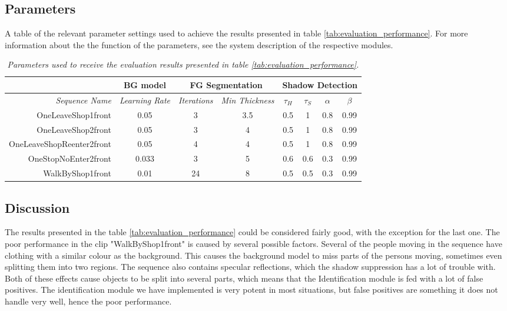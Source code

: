 \subsection{Parameters}
A table of the relevant parameter settings used to achieve the results presented in table \ref{tab:evaluation_performance}. For more information about the the function of the parameters, see the system description of the respective modules.
\begin{table}[h]
\centering
	\begin{tabular}{r | c || c | c || c | c | c | c }
	&	\multicolumn{1}{|c||}{BG model} & \multicolumn{2}{c||}{FG Segmentation} & \multicolumn{4}{c|}{Shadow Detection} \\
		\hline
		\emph{Sequence Name} & \emph{Learning Rate} & \emph{Iterations} & \emph{Min Thickness} &\emph{$\tau_H$} & \emph{$\tau_S$} & \emph{$\alpha$} & \emph{$\beta$}\\ 
		\hline \hline
		OneLeaveShop1front			& 0.05 		& 3 & 3.5 	& 0.5 & 1 & 0.8 & 0.99\\
		OneLeaveShop2front			& 0.05 		& 3 & 4 	& 0.5 & 1 & 0.8 & 0.99\\
		OneLeaveShopReenter2front	& 0.05		& 4 & 4 	& 0.5 & 1 & 0.8 & 0.99\\
		OneStopNoEnter2front 		& 0.033		& 3 & 5 	& 0.6 & 0.6 & 0.3 & 0.99\\
		WalkByShop1front 			& 0.01	 	& 24 & 8 	& 0.5 & 0.5 & 0.3 & 0.99\\
	\end{tabular}
	\caption{\textit{Parameters used to receive the evaluation results presented in table \ref{tab:evaluation_performance}.}}
	\label{tab:evaluation_parameters}
\end{table}

\subsection{Discussion}
The results presented in the table \ref{tab:evaluation_performance} could be considered fairly good, with the exception for the last one. The poor performance in the clip "WalkByShop1front" is caused by several possible factors. Several of the people moving in the sequence have clothing with a similar colour as the background. This causes the background model to miss parts of the persons moving, sometimes even splitting them into two regions. The sequence also contains specular reflections, which the shadow suppression has a lot of trouble with. Both of these effects cause objects to be split into several parts, which means that the Identification module is fed with a lot of false positives. The identification module we have implemented is very potent in most situations, but false positives are something it does not handle very well, hence the poor performance.



